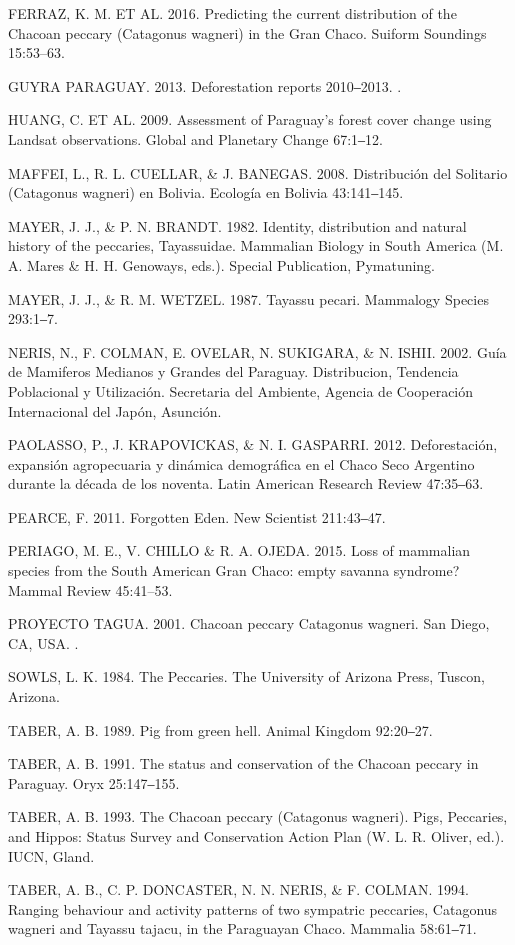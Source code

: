 \documentclass[
  x11names]{article}
\begin{document}
FERRAZ, K. M. ET AL. 2016. Predicting the current distribution of the
Chacoan peccary (Catagonus wagneri) in the Gran Chaco. Suiform Soundings
15:53--63.

GUYRA PARAGUAY. 2013. Deforestation reports 2010‒2013. .

HUANG, C. ET AL. 2009. Assessment of Paraguay's forest cover change
using Landsat observations. Global and Planetary Change 67:1‒12.

MAFFEI, L., R. L. CUELLAR, \& J. BANEGAS. 2008. Distribución del
Solitario (Catagonus wagneri) en Bolivia. Ecología en Bolivia
43:141‒145.

MAYER, J. J., \& P. N. BRANDT. 1982. Identity, distribution and natural
history of the peccaries, Tayassuidae. Mammalian Biology in South
America (M. A. Mares \& H. H. Genoways, eds.). Special Publication,
Pymatuning.

MAYER, J. J., \& R. M. WETZEL. 1987. Tayassu pecari. Mammalogy Species
293:1‒7.

NERIS, N., F. COLMAN, E. OVELAR, N. SUKIGARA, \& N. ISHII. 2002. Guía de
Mamiferos Medianos y Grandes del Paraguay. Distribucion, Tendencia
Poblacional y Utilización. Secretaria del Ambiente, Agencia de
Cooperación Internacional del Japón, Asunción.

PAOLASSO, P., J. KRAPOVICKAS, \& N. I. GASPARRI. 2012. Deforestación,
expansión agropecuaria y dinámica demográfica en el Chaco Seco Argentino
durante la década de los noventa. Latin American Research Review
47:35‒63.

PEARCE, F. 2011. Forgotten Eden. New Scientist 211:43‒47.

PERIAGO, M. E., V. CHILLO \& R. A. OJEDA. 2015. Loss of mammalian
species from the South American Gran Chaco: empty savanna syndrome?
Mammal Review 45:41--53.

PROYECTO TAGUA. 2001. Chacoan peccary Catagonus wagneri. San Diego, CA,
USA. .

SOWLS, L. K. 1984. The Peccaries. The University of Arizona Press,
Tuscon, Arizona.

TABER, A. B. 1989. Pig from green hell. Animal Kingdom 92:20‒27.

TABER, A. B. 1991. The status and conservation of the Chacoan peccary in
Paraguay. Oryx 25:147‒155.

TABER, A. B. 1993. The Chacoan peccary (Catagonus wagneri). Pigs,
Peccaries, and Hippos: Status Survey and Conservation Action Plan (W. L.
R. Oliver, ed.). IUCN, Gland.

TABER, A. B., C. P. DONCASTER, N. N. NERIS, \& F. COLMAN. 1994. Ranging
behaviour and activity patterns of two sympatric peccaries, Catagonus
wagneri and Tayassu tajacu, in the Paraguayan Chaco. Mammalia 58:61‒71.
\end{document}
